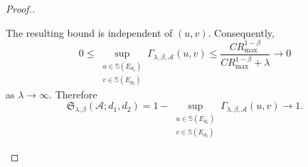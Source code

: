 \documentclass[10pt,a4paper]{amsart}
\begin{document}
\begin{proof}[Proof.]
\begin{itemize}
The resulting bound is independent of $(u,v)$. Consequently,
\[
0
\leq
\sup_{\substack{u\in\mathbb S(E_{d_1})\\
v\in\mathbb S(E_{d_2})}}
\Gamma_{\lambda,\beta,\mathcal{A}}(u,v)
\leq
\frac{CR_{\max}^{1-\beta}}
{CR_{\max}^{1-\beta}+\lambda}
\longrightarrow0
\]
as $\lambda\to\infty$. Therefore
\[
\mathfrak S_{\lambda,\beta}(\mathcal{A};d_1,d_2)
=
1-
\sup_{\substack{u\in\mathbb S(E_{d_1})\\
v\in\mathbb S(E_{d_2})}}
\Gamma_{\lambda,\beta,\mathcal{A}}(u,v)
\longrightarrow1.
\]

\end{itemize}
\end{proof}
\end{document}

